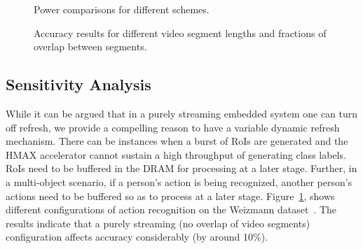 \begin{figure}[ht!]
\begin{minipage}[t]{0.48\linewidth}
\centering
{}
\caption{\label{fig:PowerResults} Power comparisons for different schemes.}
\end{minipage}
\hspace{0.1in}
\begin{minipage}[t]{0.48\linewidth}
\centering
{}
\caption{\label{fig:ActionRecognition} Accuracy results for different video segment lengths and fractions of overlap between segments.}
\end{minipage}
\vspace{-0.3in}
\end{figure}

\subsection{Sensitivity Analysis}
While it can be argued that in a purely streaming embedded system one can turn off refresh, we provide a compelling reason to have a variable dynamic refresh mechanism. There can be instances when a burst of RoIs are generated and the HMAX accelerator cannot sustain a high throughput of generating class labels. RoIs need to be buffered in the DRAM for processing at a later stage. 
Further, in a multi-object scenario, if a person's action is being recognized, another person's actions need to be buffered so as to process at a later stage. Figure~\ref{fig:ActionRecognition}, shows different configurations of action recognition on the Weizmann dataset~\cite{Weizmann}. The results indicate that a purely streaming (no overlap of video segments) configuration affects accuracy considerably (by around 10\%).  



